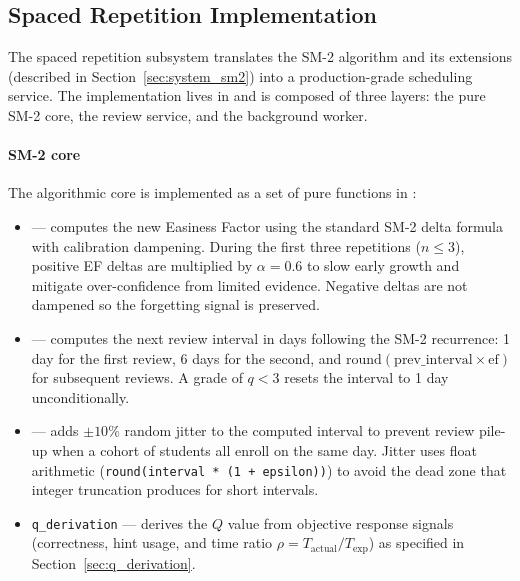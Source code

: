 \subsection{Spaced Repetition Implementation}
\label{sec:impl_sr}

The spaced repetition subsystem translates the SM-2 algorithm and its extensions (described in Section~\ref{sec:system_sm2}) into a production-grade scheduling service. The implementation lives in  and is composed of three layers: the pure SM-2 core, the review service, and the background worker.

\paragraph{SM-2 core}
The algorithmic core is implemented as a set of pure functions in :

\begin{itemize}
    \item {} — computes the new Easiness Factor using the standard SM-2 delta formula with calibration dampening. During the first three repetitions ($n \leq 3$), positive EF deltas are multiplied by $\alpha = 0.6$ to slow early growth and mitigate over-confidence from limited evidence. Negative deltas are not dampened so the forgetting signal is preserved.
    \item {} — computes the next review interval in days following the SM-2 recurrence: 1 day for the first review, 6 days for the second, and $\text{round}(\text{prev\_interval} \times \text{ef})$ for subsequent reviews. A grade of $q < 3$ resets the interval to 1 day unconditionally.
    \item {} — adds $\pm 10\%$ random jitter to the computed interval to prevent review pile-up when a cohort of students all enroll on the same day. Jitter uses float arithmetic (\texttt{round(interval * (1 + epsilon))}) to avoid the dead zone that integer truncation produces for short intervals.
    \item \texttt{q\_derivation} — derives the $Q$ value from objective response signals (correctness, hint usage, and time ratio $\rho = T_{\text{actual}} / T_{\text{exp}}$) as specified in Section~\ref{sec:q_derivation}.
\end{itemize}

